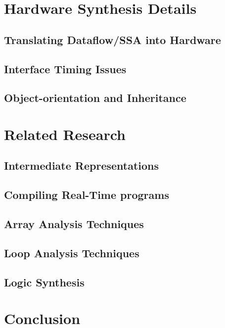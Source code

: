 \documentclass[11pt,notitlepage,twocolumn]{article}
\begin{document}
\section{Hardware Synthesis Details}
\subsection{Translating Dataflow/SSA into Hardware}
\subsection{Interface Timing Issues}
\subsection{Object-orientation and Inheritance}
\section{Related Research}
\subsection{Intermediate Representations}
\subsection{Compiling Real-Time programs}
\subsection{Array Analysis Techniques}
\subsection{Loop Analysis Techniques}
\subsection{Logic Synthesis}
\section{Conclusion}


\end{document}
